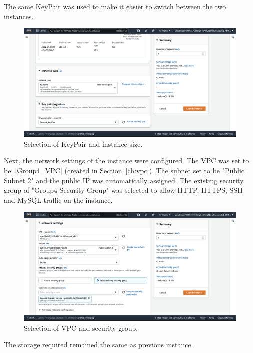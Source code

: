 \clearpage
The same KeyPair was used to make it easier to switch between the two instances.

\begin{figure}[!htbp]
	  \centering
	  \includegraphics[width=\textwidth]{resources/elb/elb-instance-2-type-and-keypair}
	  \caption{Selection of KeyPair and instance size.}
	  \label{fig:elb-type-and-keypair}
\end{figure}

Next, the network settings of the instance were configured.
The VPC was set to be \texttt|Group4_VPC| (created in Section~\ref{ch:vpc}).
The subnet set to be "Public Subnet 2" and the public IP was automatically assigned.
The existing security group of "Group4-Security-Group" was selected to allow HTTP, HTTPS, SSH and MySQL traffic on the
instance.

\begin{figure}[!htbp]
	  \centering
	  \includegraphics[width=\textwidth]{resources/elb/elb-instance-2-network-settings}
	  \caption{Selection of VPC and security group.}
	  \label{fig:elb-instance-2-network-setting}
\end{figure}

\clearpage
The storage required remained the same as previous instance.

